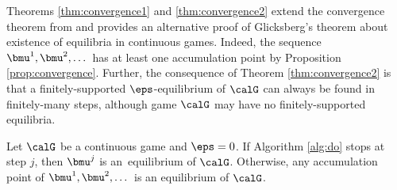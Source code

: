 Theorems \ref{thm:convergence1} and \ref{thm:convergence2} extend the convergence theorem from \cite{Adam21} and provides an alternative proof of Glicksberg's theorem \cite{Glicksberg52} about existence of equilibria in continuous games. Indeed, the sequence $\bmu^1,\bmu^2,\dots$ has at least one accumulation point by Proposition \ref{prop:convergence}. Further, the consequence of Theorem \ref{thm:convergence2} is that a finitely-supported $\eps$-equilibrium of $\calG$ can always  be found in finitely-many steps, although game $\calG$ may have no finitely-supported equilibria.

\begin{theorem}\label{thm:convergence1}
	Let $\calG$ be a continuous game and $\eps=0$. If Algorithm \ref{alg:do} stops at step $j$, then $\bmu^j$ is an~equilibrium of $\calG$. Otherwise, any accumulation point of $\bmu^1,\bmu^2,\dots$ is an equilibrium of $\calG$.
\end{theorem}
